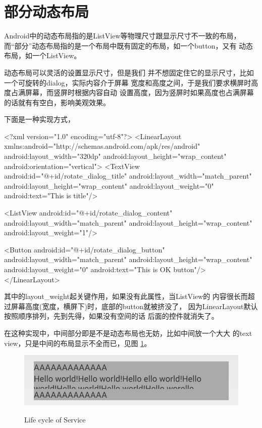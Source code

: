 ﻿\section[部分动态布局]{部分动态布局}
Android中的动态布局指的是ListView等物理尺寸跟显示尺寸不一致的布局，
而“部分”动态布局指的是一个布局中既有固定的布局，如一个button，又有
动态布局，如一个ListView。

动态布局可以灵活的设置显示尺寸，但是我们
并不想固定住它的显示尺寸，比如一个可旋转的dialog，实际内容介于屏幕
宽度和高度之间，于是我们要求横屏时高度占满屏幕，而竖屏时根据内容自动
设置高度，因为竖屏时如果高度也占满屏幕的话就有有空白，影响美观效果。

下面是一种实现方式，

\begin{xmlcode}
<?xml version="1.0" encoding="utf-8"?>
<LinearLayout
  xmlns:android="http://schemas.android.com/apk/res/android"
  android:layout_width="320dp"
  android:layout_height="wrap_content"
  android:orientation="vertical">
  <TextView
    android:id="@+id/rotate_dialog_title"
    android:layout_width="match_parent"
    android:layout_height="wrap_content"
    android:layout_weight="0"
    android:text="This is title"/>
    
  <ListView
    android:id="@+id/rotate_dialog_content"
    android:layout_width="match_parent"
    android:layout_height="wrap_content"
    android:layout_weight="1"/>

  <Button
    android:id="@+id/rotate_dialog_button"
    android:layout_width="match_parent"
    android:layout_height="wrap_content"
    android:layout_weight="0"
    android:text="This is OK button"/>
</LinearLayout>
\end{xmlcode}

其中的layout\_weight起关键作用，如果没有此属性，当ListView的
内容很长而超过屏幕高度(宽度，横屏下)时，底部的button就被挤没了，
因为LinearLayout默认按照顺序排列，先到先得，如果没有空间的话
后面的控件就消失了。

在这种实现中，中间部分即是不是动态布局也无妨，比如中间放一个大大
的text view，只是中间的布局显示不全而已，见图 \ref{fig:dynamic}。
\begin{figure}[ht]
  \centering
  \includegraphics[width=.7\textwidth]{picturedir/dynamic_layout.png}\\
  \caption{Life cycle of Service}\label{fig:dynamic}
\end{figure}
